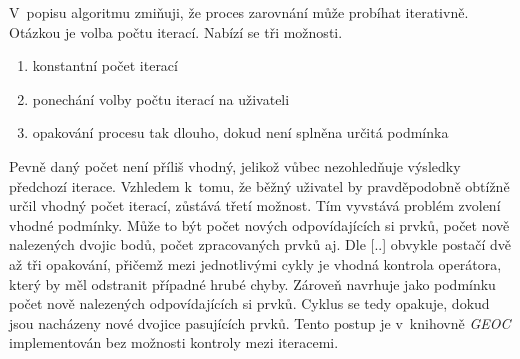V~popisu algoritmu zmiňuji, že proces zarovnání může probíhat iterativně.
Otázkou je volba počtu iterací. Nabízí se tři možnosti.
\begin{enumerate}
 \item konstantní počet iterací
 \item ponechání volby počtu iterací na uživateli
 \item opakování procesu tak dlouho, dokud není splněna určitá podmínka
\end{enumerate}
Pevně daný počet není příliš vhodný, jelikož vůbec nezohledňuje výsledky
předchozí iterace. Vzhledem k~tomu, že běžný uživatel by pravděpodobně
obtížně určil vhodný počet iterací, zůstává třetí možnost. Tím vyvstává
problém zvolení vhodné podmínky. Může to být počet nových odpovídajících 
si prvků, počet nově nalezených dvojic bodů, počet zpracovaných prvků aj.
Dle [..]  obvykle postačí dvě až tři opakování, %
přičemž mezi jednotlivými cykly je vhodná kontrola operátora,
který by měl odstranit případné hrubé chyby. Zároveň navrhuje jako podmínku
počet nově nalezených odpovídajících si prvků. Cyklus se tedy opakuje,
dokud jsou nacházeny nové dvojice pasujících prvků. Tento postup je   %
v~knihovně \textit{GEOC} implementován bez možnosti kontroly mezi iteracemi. 



